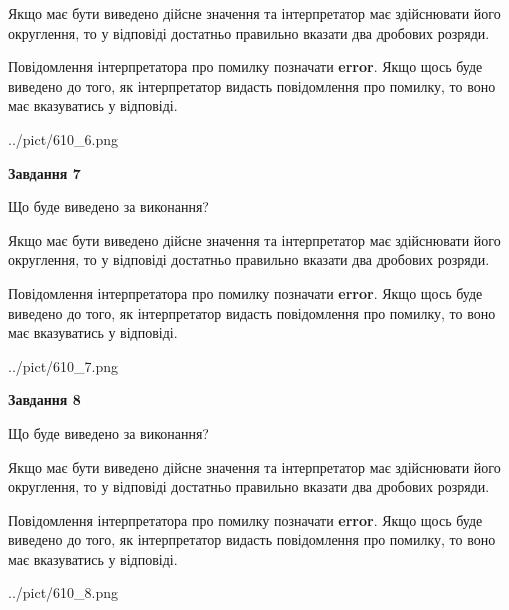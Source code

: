 \documentclass[12pt, ukrainian]{article}
\begin{document}
{\begin {Large}
Якщо має бути виведено дійсне значення та інтерпретатор має здійснювати його округлення, 
то у відповіді достатньо правильно вказати два дробових розряди.

Повідомлення інтерпретатора про помилку позначати \textbf{error}.
Якщо щось буде виведено до того, як інтерпретатор видасть повідомлення про помилку, 
то воно має вказуватись у відповіді. \par

\begin{center}
	{../pict/610_6.png}
\end{center}
\newpage

{\begin {center}\textbf{Завдання 7}\end {center}}\par
Що буде виведено за виконання? \par

Якщо має бути виведено дійсне значення та інтерпретатор має здійснювати його округлення, 
то у відповіді достатньо правильно вказати два дробових розряди.

Повідомлення інтерпретатора про помилку позначати \textbf{error}.
Якщо щось буде виведено до того, як інтерпретатор видасть повідомлення про помилку, 
то воно має вказуватись у відповіді. \par

\begin{center}
	{../pict/610_7.png}
\end{center}
\newpage

{\begin {center}\textbf{Завдання 8}\end {center}}\par
Що буде виведено за виконання? \par

Якщо має бути виведено дійсне значення та інтерпретатор має здійснювати його округлення, 
то у відповіді достатньо правильно вказати два дробових розряди.

Повідомлення інтерпретатора про помилку позначати \textbf{error}.
Якщо щось буде виведено до того, як інтерпретатор видасть повідомлення про помилку, 
то воно має вказуватись у відповіді. \par

\begin{center}
	{../pict/610_8.png}
\end{center}
\newpage


\end{Large}}
\end{document}
